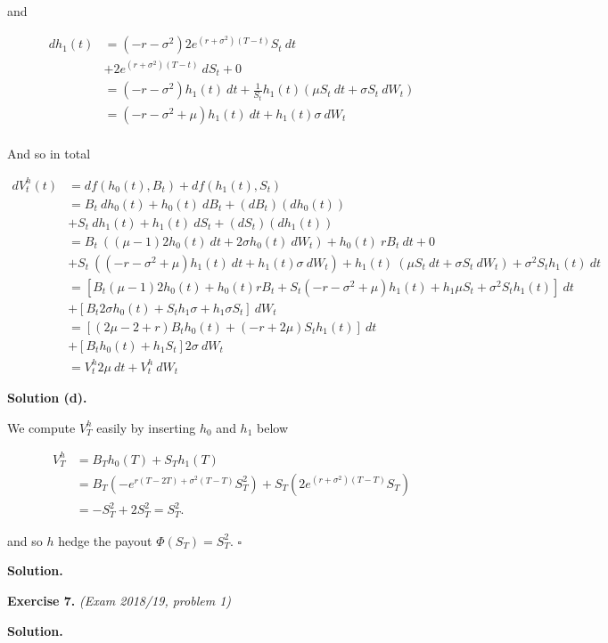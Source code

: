 \documentclass[
]{article}
\begin{document}
and

\begin{align*}
dh_1(t)&=(-r-\sigma^2)2e^{(r+\sigma^2)(T-t)}S_t\ dt\\
&+2e^{(r+\sigma^2)(T-t)}\ dS_t+0\\
&=(-r-\sigma^2)h_1(t)\ dt+\frac{1}{S_t}h_1(t)(\mu S_t\ dt+\sigma S_t\ dW_t)\\
&=(-r-\sigma^2+\mu)h_1(t)\ dt+h_1(t)\sigma \ dW_t\\
\end{align*}

And so in total

\begin{align*}
dV_t^h(t)&=df(h_0(t),B_t)+df(h_1(t),S_t)\\
&=B_t\ dh_0(t)+h_0(t)\ dB_t+(dB_t)(dh_0(t))\\
&+S_t\ dh_1(t)+h_1(t)\ dS_t+(dS_t)(dh_1(t))\\
&=B_t\ ((\mu-1)2h_0(t)\ dt+2\sigma h_0(t)\ dW_t)+h_0(t)\ rB_t\ dt+0\\
&+S_t\ ((-r-\sigma^2+\mu)h_1(t)\ dt+h_1(t)\sigma \ dW_t)+h_1(t)\ (\mu S_t\ dt+\sigma S_t\ dW_t)+\sigma^2S_th_1(t)\ dt\\
&=\left[B_t(\mu-1)2h_0(t)+h_0(t)rB_t+S_t(-r-\sigma^2+\mu)h_1(t)+h_1\mu S_t+\sigma^2S_th_1(t)\right]\ dt\\
&+\left[B_t2\sigma h_0(t)+S_th_1\sigma+h_1\sigma S_t\right]\ dW_t\\
&=\left[(2\mu-2+r)B_th_0(t)+(-r+2\mu)S_th_1(t)\right]\ dt\\
&+\left[B_t h_0(t)+h_1 S_t\right]2\sigma\ dW_t\\
&=V_t^h2\mu\ dt+V_t^h\ dW_t
\end{align*}

\textbf{Solution (d).}

We compute \(V_T^h\) easily by inserting \(h_0\) and \(h_1\) below

\begin{align*}
V_T^h&=B_Th_0(T)+S_Th_1(T)\\
&=B_T\left(-e^{r(T-2T)+\sigma^2(T-T)}S_T^2\right)+S_T\left(2e^{(r+\sigma^2)(T-T)}S_T\right)\\
&=-S_T^2+2S_T^2=S_T^2.
\end{align*}

and so \(h\) hedge the payout \(\Phi(S_T)=S_T^2\). \(\square\)

\textbf{Solution.}

\textbf{Exercise 7.} \emph{(Exam 2018/19, problem 1)}

\textbf{Solution.}
\end{document}
